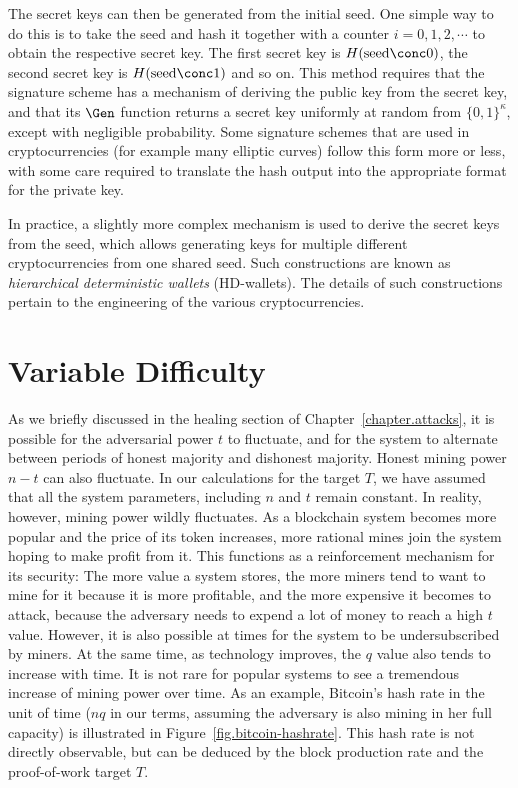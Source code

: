 The secret keys can then be generated from the initial seed. One simple way to do
this is to take the seed and hash it together with a counter $i = 0, 1, 2, \cdots$
to obtain the respective secret key. The first secret key is $H(\mathrm{seed} \conc 0)$,
the second secret key is $H(\mathrm{seed} \conc 1)$ and so on.
This method requires that the signature scheme has a mechanism of deriving
the public key from the secret key, and that its $\Gen$ function returns a
secret key uniformly at random from $\{0, 1\}^\kappa$, except with negligible
probability. Some signature schemes that are used in cryptocurrencies (for example
many elliptic curves) follow this form more or less, with some care required to
translate the hash output into the appropriate format for the private key.

In practice, a slightly more complex mechanism is used to derive the secret keys from
the seed, which allows generating keys for multiple different cryptocurrencies from
one shared seed. Such constructions are known as \emph{hierarchical deterministic wallets}
(HD-wallets). The details of such constructions
pertain to the engineering of the various cryptocurrencies.


\section{Variable Difficulty}

As we briefly discussed in the healing section of Chapter~\ref{chapter.attacks},
it is possible for the adversarial power $t$ to fluctuate, and for the system to
alternate between periods of honest majority and dishonest majority.
Honest mining power $n - t$ can also fluctuate. In our calculations for the target $T$,
we have assumed that all the system parameters, including $n$ and $t$ remain
constant. In reality, however, mining power wildly fluctuates. As a blockchain
system becomes more popular and the price of its token increases,
more rational mines join the system hoping to make profit from it. This functions
as a reinforcement mechanism for its security: The more value a system stores,
the more miners tend to want to mine for it because it is more profitable, and
the more expensive it becomes to attack, because the adversary needs to
expend a lot of money to reach a high $t$ value. However, it is also possible
at times for the system to be undersubscribed by miners.
At the same time, as technology improves, the $q$ value also tends to increase with time.
It is not rare for popular systems to see a tremendous increase of mining
power over time. As an example, Bitcoin's hash rate in the unit of time ($nq$
in our terms, assuming the adversary is also mining in her full capacity)
is illustrated in Figure~\ref{fig.bitcoin-hashrate}. This
hash rate is not directly observable, but can be deduced by the block
production rate and the proof-of-work target $T$.

